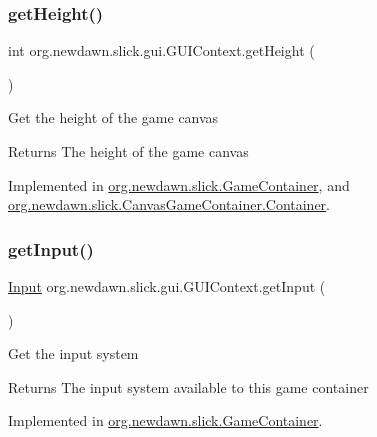 \subsubsection{\texorpdfstring{get\+Height()}{getHeight()}}
{\footnotesize\ttfamily int org.\+newdawn.\+slick.\+gui.\+G\+U\+I\+Context.\+get\+Height (\begin{DoxyParamCaption}{ }\end{DoxyParamCaption})}

Get the height of the game canvas

\begin{DoxyReturn}{Returns}
The height of the game canvas 
\end{DoxyReturn}


Implemented in \mbox{\hyperlink{classorg_1_1newdawn_1_1slick_1_1_game_container_a7eff88473fe5715fdfc2f92e8cb48521}{org.\+newdawn.\+slick.\+Game\+Container}}, and \mbox{\hyperlink{classorg_1_1newdawn_1_1slick_1_1_canvas_game_container_1_1_container_a673c1f67eda4f34499c9c98ed68e6b01}{org.\+newdawn.\+slick.\+Canvas\+Game\+Container.\+Container}}.

\mbox{\label{interfaceorg_1_1newdawn_1_1slick_1_1gui_1_1_g_u_i_context_a716423197d42cf412e98f2650603914f}} 
\subsubsection{\texorpdfstring{get\+Input()}{getInput()}}
{\footnotesize\ttfamily \mbox{\hyperlink{classorg_1_1newdawn_1_1slick_1_1_input}{Input}} org.\+newdawn.\+slick.\+gui.\+G\+U\+I\+Context.\+get\+Input (\begin{DoxyParamCaption}{ }\end{DoxyParamCaption})}

Get the input system

\begin{DoxyReturn}{Returns}
The input system available to this game container 
\end{DoxyReturn}


Implemented in \mbox{\hyperlink{classorg_1_1newdawn_1_1slick_1_1_game_container_a6042fd06c54872f9f791bd33beffec88}{org.\+newdawn.\+slick.\+Game\+Container}}.


